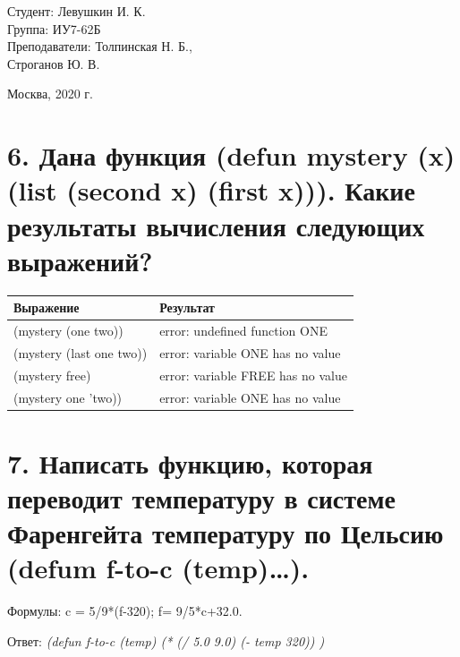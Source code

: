 \documentclass[a4paper,12pt]{article}
\begin{document}
	\vspace*{15mm} 	
	
	\large
	\begin{flushright}
		Студент: Левушкин И. К. \\
		Группа: ИУ7-62Б \\
		Преподаватели: Толпинская Н. Б., \\ Строганов Ю. В. \\
	\end{flushright}
	
	\vspace*{30mm}
	\begin{center}
		Москва, 2020 г.  
	\end{center}
	\thispagestyle{empty}
	
	
	\newpage
	
	\section*{6. Дана функция (defun mystery (x) (list (second x) (first x))).
Какие результаты вычисления следующих выражений?}
	
	\begin{table} [h!]
		\begin{center}
			\begin{tabular}{|l|l|}
				\hline
				{\bf  Выражение} &    {\bf Результат} \\
				\hline
				{(mystery (one two))} & error: undefined function ONE\\
				\hline
				{(mystery (last one two))} & error: variable ONE has no value\\
				\hline
				{(mystery free)} & error: variable FREE has no value\\
				\hline
				{(mystery one 'two))} & error: variable ONE has no value\\
				\hline
			\end{tabular}  
			\label{m1}
		\end{center}
	\end{table}

	\section*{7. Написать функцию, которая переводит температуру в системе Фаренгейта
температуру по Цельсию (defum f-to-c (temp)…).
}
	
	Формулы: 	c = 5/9*(f-320); 	f= 9/5*c+32.0.
	
	Ответ: \textit{(defun f-to-c (temp) (* (/ 5.0 9.0) (- temp 320)) )}
	
\end{document}
